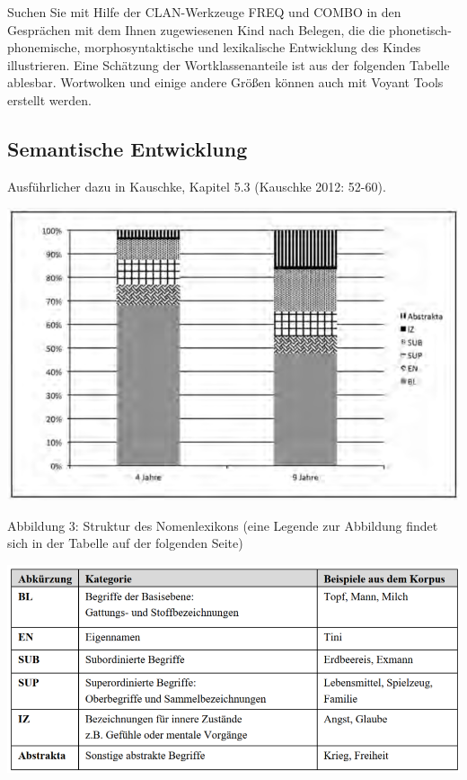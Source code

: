 \documentclass[
  letterpaper,
]{scrbook}
\begin{document}
Suchen Sie mit Hilfe der CLAN-Werkzeuge FREQ und COMBO in den Gesprächen
mit dem Ihnen zugewiesenen Kind nach Belegen, die die
phonetisch-phonemische, morphosyntaktische und lexikalische Entwicklung
des Kindes illustrieren. Eine Schätzung der Wortklassenanteile ist aus
der folgenden Tabelle ablesbar. Wortwolken und einige andere Größen
können auch mit Voyant Tools erstellt werden.

\hypertarget{semantische-entwicklung}{%
\subsection{Semantische Entwicklung}\label{semantische-entwicklung}}

Ausführlicher dazu in Kauschke, Kapitel 5.3 (Kauschke 2012: 52-60).

\includegraphics[width=1\textwidth,height=\textheight]{./pictures/kauschke_abb3.png}

Abbildung 3: Struktur des Nomenlexikons (eine Legende zur Abbildung
findet sich in der Tabelle auf der folgenden Seite)

\includegraphics[width=1\textwidth,height=\textheight]{./pictures/kauschke_tab10.png}
\end{document}
